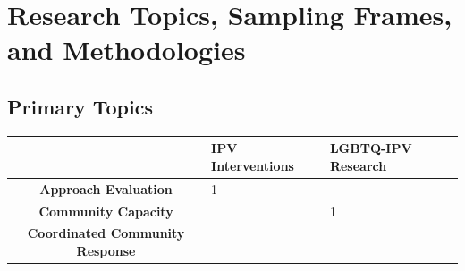 \documentclass[]{tufte-handout}
\begin{document}
\tufteskip

\newpage

\section{Research Topics, Sampling Frames, and
Methodologies}\label{research-topics-sampling-frames-and-methodologies}

\subsection{Primary Topics}\label{primary-topics}

\begin{longtable}[]{@{}cll@{}}
\toprule
\begin{minipage}[b]{0.47\columnwidth}\centering\strut
~\strut
\end{minipage} & \begin{minipage}[b]{0.22\columnwidth}\raggedright\strut
IPV Interventions\strut
\end{minipage} & \begin{minipage}[b]{0.22\columnwidth}\raggedright\strut
LGBTQ-IPV Research\strut
\end{minipage}\tabularnewline
\midrule
\endhead
\begin{minipage}[t]{0.47\columnwidth}\centering\strut
\textbf{Approach Evaluation}\strut
\end{minipage} & \begin{minipage}[t]{0.22\columnwidth}\raggedright\strut
1\strut
\end{minipage} & \begin{minipage}[t]{0.22\columnwidth}\raggedright\strut
\strut
\end{minipage}\tabularnewline
\begin{minipage}[t]{0.47\columnwidth}\centering\strut
\textbf{Community Capacity}\strut
\end{minipage} & \begin{minipage}[t]{0.22\columnwidth}\raggedright\strut
\strut
\end{minipage} & \begin{minipage}[t]{0.22\columnwidth}\raggedright\strut
1\strut
\end{minipage}\tabularnewline
\begin{minipage}[t]{0.47\columnwidth}\centering\strut
\textbf{Coordinated Community Response}\strut
\end{minipage} & \begin{minipage}[t]{0.22\columnwidth}\raggedright\strut

\end{minipage}
\end{longtable}
\end{document}
